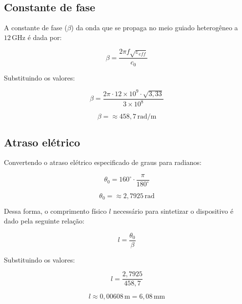 \documentclass[12pt,a4paper]{report}
\begin{document}
\subsection{Constante de fase}

A constante de fase ($\beta$) da onda que se propaga no meio guiado heterogêneo a $12\,\text{GHz}$ é dada por:

\begin{equation}
\boxed{
\beta = \frac{2\pi f\sqrt{\varepsilon_{eff}}}{c_0}
}
\end{equation}

Substituindo os valores:

\begin{equation}
\beta = \frac{2\pi \cdot 12\times10^9 \cdot \sqrt{3,33}}{3\times10^8}
\end{equation}

\begin{equation}
\boxed{
\beta = \approx 458,7\,\text{rad/m}
}
\end{equation}

\subsection{Atraso elétrico}

Convertendo o atraso elétrico especificado de graus para radianos:

\begin{equation}
\theta_0 = 160^{\circ} \cdot \frac{\pi}{180^{\circ}}
\end{equation}

\begin{equation}
\boxed{
\theta_0 = \approx 2,7925\,\text{rad}
}
\end{equation}

Dessa forma, o comprimento físico $l$ necessário para sintetizar o dispositivo é dado pela seguinte relação:

\begin{equation}
\boxed{
l = \frac{\theta_0}{\beta}
}
\end{equation}

Substituindo os valores:

\begin{equation}
l = \frac{2,7925}{458,7}
\end{equation}

\begin{equation}
\boxed{
l \approx 0,00608\,\text{m} = 6,08\,\text{mm}
}
\end{equation}
\end{document}
